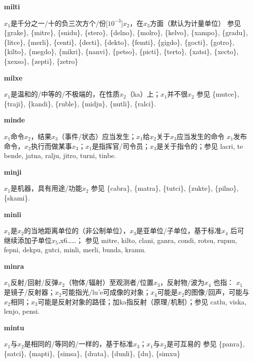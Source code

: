\documentclass[notitlepage,twocolumn,a4paper,10pt]{book}
\begin{document}
{\sffamily\bfseries milti}\enspace {\ttfamily\bfseries[mil]}  $x_1$是千分之一\slash{}十的负三次方个\slash{}份[$10^{-3}$]$x_2$，在$x_3$方面（默认为计量单位） \textemdash{} 参见 \{grake\}, \{mitre\}, \{snidu\}, \{stero\}, \{delno\}, \{molro\}, \{kelvo\}, \{xampo\}, \{gradu\}, \{litce\}, \{merli\}, \{centi\}, \{decti\}, \{dekto\}, \{femti\}, \{gigdo\}, \{gocti\}, \{gotro\}, \{kilto\}, \{megdo\}, \{mikri\}, \{nanvi\}, \{petso\}, \{picti\}, \{terto\}, \{xatsi\}, \{xecto\}, \{xexso\}, \{zepti\}, \{zetro\}

{\sffamily\bfseries milxe}\enspace {\ttfamily\bfseries[    mli]}  $x_1$是温和的\slash{}中等的\slash{}不极端的，在性质$x_2$（ka）上；$x_1$并不很$x_2$ \textemdash{} 参见 \{mutce\}, \{traji\}, \{kandi\}, \{ruble\}, \{midju\}, \{nutli\}, \{ralci\}.

{\sffamily\bfseries minde}\enspace {\ttfamily\bfseries[mid     mi'e]}  $x_1$命令$x_2$，结果$x_3$（事件\slash{}状态）应当发生；$x_1$给$x_2$关于$x_3$应当发生的命令 \textemdash{} $x_1$发布命令，$x_2$执行而做某事$x_3$；$x_1$是指挥官\slash{}司令员；$x_3$是关于指令的；参见 {lacri}, te {bende}, {jatna}, {ralju}, {jitro}, {turni}, {tinbe}.

{\sffamily\bfseries minji}\enspace {\ttfamily\bfseries[        mi'i]}  $x_1$是机器，具有用途\slash{}功能$x_2$ \textemdash{} 参见 \{cabra\}, \{matra\}, \{tutci\}, \{zukte\}, \{pilno\}, \{skami\}.

{\sffamily\bfseries minli} $x_1$是$x_2$的当地距离单位的（非公制单位），$x_3$是亚单位\slash{}子单位，基于标准$x_4$ \textemdash{} 后可继续添加子单位$x_5$,x6……； 参见 {mitre}, {kilto}, {clani}, {ganra}, {condi}, {rotsu}, {rupnu}, {fepni}, {dekpu}, {gutci}, {minli}, {merli}, {bunda}, {kramu}.

{\sffamily\bfseries minra}\enspace {\ttfamily\bfseries[mir]}  $x_1$反射\slash{}回射\slash{}反弹$x_2$（物体\slash{}辐射）至观测者\slash{}位置$x_3$，反射物\slash{}波为$x_4$ \textemdash{} 也指： $x_1$是镜子\slash{}反射器；$x_2$可能指光\slash{}lu'e可成像的对象；$x_4$可能是$x_2$的图像\slash{}回声，可能与$x_2$相同；$x_3$可能是反射对象的路径；加ka指反射（原理\slash{}机制）；参见 {catlu}, {viska}, {lenjo}, {pensi}.

{\sffamily\bfseries mintu}\enspace {\ttfamily\bfseries[mit     mi'u]}  $x_1$与$x_2$是相同的\slash{}等同的\slash{}一样的，基于标准$x_3$；$x_1$与$x_2$是可互易的 \textemdash{} 参见 \{panra\}, \{satci\}, \{mapti\}, \{simsa\}, \{drata\}, \{dunli\}, \{du\}, \{simxu\}
\end{document}
